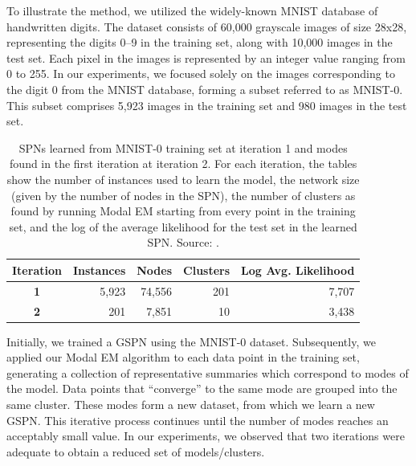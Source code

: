 To illustrate the method, we utilized the widely-known MNIST database of handwritten digits. The dataset consists of 60,000 grayscale images of size 28x28, representing the digits 0--9 in the training set, along with 10,000 images in the test set. Each pixel in the images is represented by an integer value ranging from 0 to 255. In our experiments, we focused solely on the images corresponding to the digit 0 from the MNIST database, forming a subset referred to as MNIST-0. This subset comprises 5,923 images in the training set and 980 images in the test set.

\begin{table}
  \centering

  \begin{tabular}{crrrr}
    \toprule
    \bfseries Iteration & \bfseries Instances & \bfseries Nodes & \bfseries Clusters & \bfseries Log Avg. Likelihood \\ \midrule
    \textbf{1}          & 5,923               & 74,556          & 201                & ~7,707                        \\
    \textbf{2}          & 201                 & 7,851           & 10                 & ~3,438                        \\
    \bottomrule
  \end{tabular}

  \caption[SPNs learned from MNIST-0 training set]{SPNs learned from MNIST-0 training set at iteration 1 and modes found in the first iteration at iteration 2. For each iteration, the tables show the number of instances used to learn the model, the network size (given by the number of nodes in the SPN), the number of clusters as found by running Modal EM starting from every point in the training set, and the log of the average likelihood for the test set in the learned SPN. Source: \citet{Madeira2022}.}
  \label{tab:mnist}
\end{table}

Initially, we trained a GSPN using the MNIST-0 dataset. Subsequently, we applied our Modal EM algorithm to each data point in the training set, generating a collection of representative summaries which correspond to modes of the model. Data points that ``converge'' to the same mode are grouped into the same cluster. These modes form a new dataset, from which we learn a new GSPN. This iterative process continues until the number of modes reaches an acceptably small value. In our experiments, we observed that two iterations were adequate to obtain a reduced set of models/clusters.

